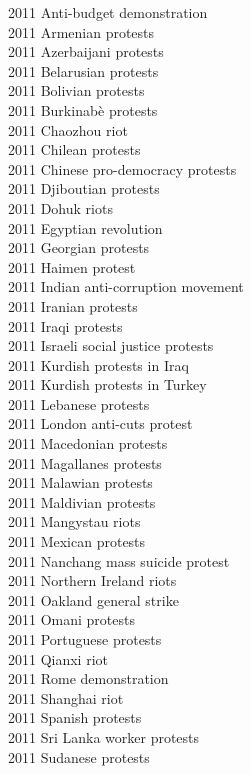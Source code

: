 2011 Anti-budget demonstration\\
2011 Armenian protests\\
2011 Azerbaijani protests\\
2011 Belarusian protests\\
2011 Bolivian protests\\
2011 Burkinabè protests\\
2011 Chaozhou riot\\
2011 Chilean protests\\
2011 Chinese pro-democracy protests\\
2011 Djiboutian protests\\
2011 Dohuk riots\\
2011 Egyptian revolution\\
2011 Georgian protests\\
2011 Haimen protest\\
2011 Indian anti-corruption movement\\
2011 Iranian protests\\
2011 Iraqi protests\\
2011 Israeli social justice protests\\
2011 Kurdish protests in Iraq\\
2011 Kurdish protests in Turkey\\
2011 Lebanese protests\\
2011 London anti-cuts protest\\
2011 Macedonian protests\\
2011 Magallanes protests\\
2011 Malawian protests\\
2011 Maldivian protests\\
2011 Mangystau riots\\
2011 Mexican protests\\
2011 Nanchang mass suicide protest\\
2011 Northern Ireland riots\\
2011 Oakland general strike\\
2011 Omani protests\\
2011 Portuguese protests\\
2011 Qianxi riot\\
2011 Rome demonstration\\
2011 Shanghai riot\\
2011 Spanish protests\\
2011 Sri Lanka worker protests\\
2011 Sudanese protests\\
